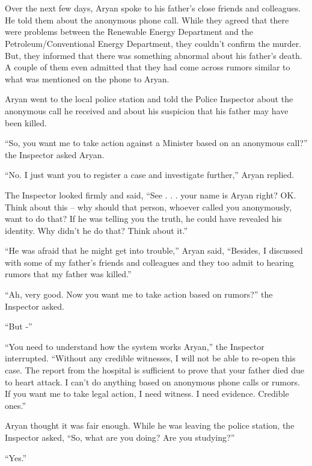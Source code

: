 \chapter{}

Over the next few days, Aryan spoke to his father's close friends and
colleagues. He told them about the anonymous phone call. While they agreed that
there were problems between the Renewable Energy Department and the
Petroleum/Conventional Energy Department, they couldn't confirm the murder. But,
they informed that there was something abnormal about his father's death. A
couple of them even admitted that they had come across rumors similar to what
was mentioned on the phone to Aryan.

Aryan went to the local police station and told the Police Inspector about the
anonymous call he received and about his suspicion that his father may have been
killed.

“So, you want me to take action against a Minister based on an anonymous call?”
the Inspector asked Aryan.

“No. I just want you to register a case and investigate further,” Aryan replied.

The Inspector looked firmly and said, “See . . . your name is Aryan right? OK.
Think about this – why should that person, whoever called you anonymously, want
to do that? If he was telling you the truth, he could have revealed his
identity. Why didn't he do that? Think about it.”

“He was afraid that he might get into trouble,” Aryan said, “Besides, I
discussed with some of my father's friends and colleagues and they too admit to
hearing rumors that my father was killed.”

“Ah, very good. Now you want me to take action based on rumors?” the Inspector
asked.

“But -”

“You need to understand how the system works Aryan,” the Inspector interrupted.
“Without any credible witnesses, I will not be able to re-open this case. The
report from the hospital is sufficient to prove that your father died due to
heart attack. I can't do anything based on anonymous phone calls or rumors. If
you want me to take legal action, I need witness. I need evidence. Credible
ones.”

Aryan thought it was fair enough. While he was leaving the police station, the
Inspector asked, “So, what are you doing? Are you studying?”

“Yes.”

